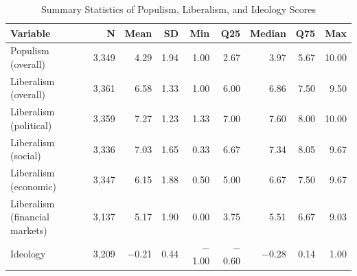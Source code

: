 \begin{table}[ht]
\caption{Summary Statistics of Populism, Liberalism, and Ideology Scores}
\label{tab:sumstats}
\centering
\footnotesize
\begin{tabular}{lrrrrrrrr}
  \toprule
Variable & N & Mean & SD & Min & Q25 & Median & Q75 & Max \\
  \midrule
Populism (overall) & 3,349 & 4.29 & 1.94 & 1.00 & 2.67 & 3.97 & 5.67 & 10.00 \\
Liberalism (overall) & 3,361 & 6.58 & 1.33 & 1.00 & 6.00 & 6.86 & 7.50 & 9.50 \\
Liberalism (political) & 3,359 & 7.27 & 1.23 & 1.33 & 7.00 & 7.60 & 8.00 & 10.00 \\
Liberalism (social) & 3,336 & 7.03 & 1.65 & 0.33 & 6.67 & 7.34 & 8.05 & 9.67 \\
Liberalism (economic) & 3,347 & 6.15 & 1.88 & 0.50 & 5.00 & 6.67 & 7.50 & 9.67 \\
Liberalism (financial markets) & 3,137 & 5.17 & 1.90 & 0.00 & 3.75 & 5.51 & 6.67 & 9.03 \\
Ideology & 3,209 & $-$0.21 & 0.44 & $-$1.00 & $-$0.60 & $-$0.28 & 0.14 & 1.00 \\
   \bottomrule
\end{tabular}
\end{table}

